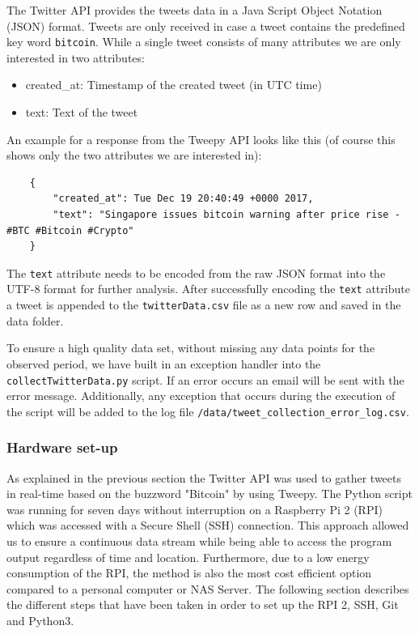 \documentclass[a4paper,12pt]{article}
\begin{document}
\begin{spacing}{1.2}
The Twitter API provides the tweets data in a Java Script Object Notation (JSON) format. Tweets are only received in case a tweet contains the predefined key word \verb|bitcoin|. While a single tweet consists of many attributes we are only interested in two attributes:
\begin{itemize}
    \item created\_at: Timestamp of the created tweet (in UTC time)
    \item text: Text of the tweet
\end{itemize}

An example for a response from the Tweepy API looks like this (of course this shows only the two attributes we are interested in):
\begin{lstlisting}
    {
        "created_at": Tue Dec 19 20:40:49 +0000 2017, 
        "text": "Singapore issues bitcoin warning after price rise - #BTC #Bitcoin #Crypto"
    }
\end{lstlisting}

The \verb|text| attribute needs to be encoded from the raw JSON format into the UTF-8 format for further analysis. After successfully encoding the \verb|text| attribute a tweet is appended to the \verb|twitterData.csv| file as a new row and saved in the data folder.

To ensure a high quality data set, without missing any data points for the observed period, we have built in an exception handler into the \verb|collectTwitterData.py| script. If an error occurs an email will be sent with the error message. Additionally, any exception that occurs during the execution of the script will be added to the log file \verb|/data/tweet_collection_error_log.csv|.

\subsubsection{Hardware set-up}
As explained in the previous section the Twitter API was used to gather tweets in real-time based on the buzzword "Bitcoin" by using Tweepy. The Python script was running for seven days without interruption on a Raspberry Pi 2 (RPI) which was accessed with a Secure Shell (SSH) connection. This approach allowed us to ensure a continuous data stream while being able to access the program output regardless of time and location. Furthermore, due to a low energy consumption of the RPI, the method is also the most cost efficient option compared to a personal computer or NAS Server. The following section describes the different steps that have been taken in order to set up the RPI 2, SSH, Git and Python3.\\


\end{spacing}
\end{document}
